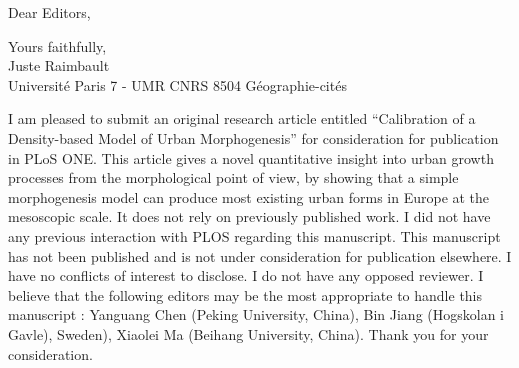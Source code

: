 \documentclass[11pt,a4paper,sans]{moderncv}        %
\begin{document}




\date{July 22, 2017}
\opening{Dear Editors,}
\closing{Yours faithfully,\\
Juste Raimbault\\
Université Paris 7 - UMR CNRS 8504 Géographie-cités
}
\makelettertitle

\justify
I am pleased to submit an original research article entitled ``Calibration of a Density-based Model of Urban Morphogenesis'' for consideration for publication in PLoS ONE. This article gives a novel quantitative insight into urban growth processes from the morphological point of view, by showing that a simple morphogenesis model can produce most existing urban forms in Europe at the mesoscopic scale. It does not rely on previously published work. I did not have any previous interaction with PLOS regarding this manuscript.
This manuscript has not been published and is not under consideration for publication elsewhere. I
have no conflicts of interest to disclose. I do not have any opposed reviewer. I believe that the following editors may be the most appropriate to handle this manuscript : Yanguang Chen (Peking University, China), Bin Jiang (Hogskolan i Gavle), Sweden), Xiaolei Ma (Beihang University, China).
Thank you for your consideration.
\justify






\end{document}
